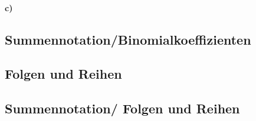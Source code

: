 \documentclass[paper=a4, fontsize=11pt]{scrartcl}
\numberwithin{equation}{section}
\numberwithin{figure}{section}
\numberwithin{table}{section}
\begin{document}
\paragraph{c)}

\subsection{Summennotation/Binomialkoeffizienten}

\subsection{Folgen und Reihen}

\subsection{Summennotation/ Folgen und Reihen}

\end{document}
